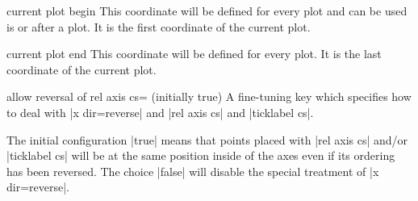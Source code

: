 \begin{predefinednode}{current plot begin}
	This coordinate will be defined for every plot and can be used is  or after a plot. It is the first coordinate of the current plot.	
\end{predefinednode}

\begin{predefinednode}{current plot end}
	This coordinate will be defined for every plot. It is the last coordinate of the current plot.	
\end{predefinednode}

\begin{pgfplotskey}{allow reversal of rel axis cs= (initially true)}
	A fine-tuning key which specifies how to deal with |x dir=reverse| and |rel axis cs| and |ticklabel cs|.

	The initial configuration |true| means that points placed with |rel axis cs| and/or |ticklabel cs| will be at the same position inside of the axes even if its ordering has been reversed. The choice |false| will disable the special treatment of |x dir=reverse|.
\end{pgfplotskey}

